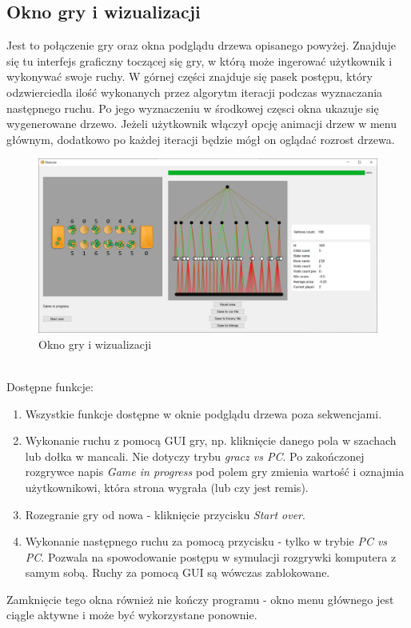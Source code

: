 \documentclass{article}
\begin{document}
\subsection{Okno gry i wizualizacji}
Jest to połączenie gry oraz okna podglądu drzewa opisanego powyżej. Znajduje się tu interfejs graficzny toczącej się gry, w którą może ingerować użytkownik i wykonywać swoje ruchy. W górnej części znajduje się pasek postępu, który odzwierciedla ilość wykonanych przez algorytm iteracji podczas wyznaczania następnego ruchu. Po jego wyznaczeniu w środkowej częsci okna ukazuje się wygenerowane drzewo. Jeżeli użytkownik włączył opcję animacji drzew w menu głównym, dodatkowo po każdej iteracji będzie mógł on oglądać rozrost drzewa.\\
\begin{figure}[h]
	\centering
	\includegraphics[width=\textwidth]{game-window}
	\caption{Okno gry i wizualizacji}
	\label{rys:gamewindow}
\end{figure}\\
Dostępne funkcje:\\
\begin{enumerate}
	\item Wszystkie funkcje dostępne w oknie podglądu drzewa poza sekwencjami.\\
	\item Wykonanie ruchu z pomocą GUI gry, np. kliknięcie danego pola w szachach lub dołka w mancali. Nie dotyczy trybu \textit{gracz vs PC}. Po zakończonej rozgrywce napis \textit{Game in progress} pod polem gry zmienia wartość i oznajmia użytkownikowi, która strona wygrała (lub czy jest remis).\\
	\item Rozegranie gry od nowa - kliknięcie przycisku \textit{Start over}.\\
	\item Wykonanie następnego ruchu za pomocą przycisku - tylko w trybie \textit{PC vs PC}. Pozwala na spowodowanie postępu w symulacji rozgrywki komputera z samym sobą. Ruchy za pomocą GUI są wówczas zablokowane.\\
\end{enumerate}
Zamknięcie tego okna również nie kończy programu - okno menu głównego jest ciągle aktywne i może być wykorzystane ponownie.
\end{document}
